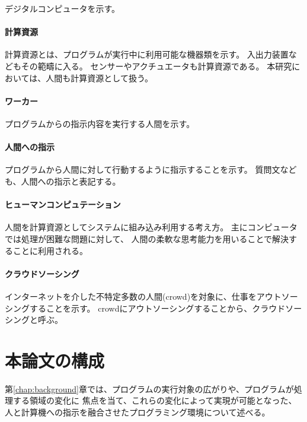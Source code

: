 デジタルコンピュータを示す。

\paragraph{計算資源}\label{ux8a08ux7b97ux8cc7ux6e90}

計算資源とは、プログラムが実行中に利用可能な機器類を示す。
入出力装置などもその範疇に入る。
センサーやアクチュエータも計算資源である。
本研究においては、人間も計算資源として扱う。

\paragraph{ワーカー}\label{ux30efux30fcux30abux30fc}

プログラムからの指示内容を実行する人間を示す。

\paragraph{人間への指示}\label{ux4ebaux9593ux3078ux306eux6307ux793a}

プログラムから人間に対して行動するように指示することを示す。
質問文なども、人間への指示と表記する。

\paragraph{ヒューマンコンピュテーション}\label{ux30d2ux30e5ux30fcux30deux30f3ux30b3ux30f3ux30d4ux30e5ux30c6ux30fcux30b7ux30e7ux30f3}

人間を計算資源としてシステムに組み込み利用する考え方。
主にコンピュータでは処理が困難な問題に対して、
人間の柔軟な思考能力を用いることで解決することに利用される。

\paragraph{クラウドソーシング}\label{ux30afux30e9ux30a6ux30c9ux30bdux30fcux30b7ux30f3ux30b0}

インターネットを介した不特定多数の人間(crowd)を対象に、仕事をアウトソーシングすることを示す。
crowdにアウトソーシングすることから、クラウドソーシングと呼ぶ。

\section{本論文の構成}\label{ux672cux8ad6ux6587ux306eux69cbux6210}

第\ref{chap:background}章では、プログラムの実行対象の広がりや、プログラムが処理する領域の変化に
焦点を当て、これらの変化によって実現が可能となった、人と計算機への指示を融合させたプログラミング環境について述べる。

